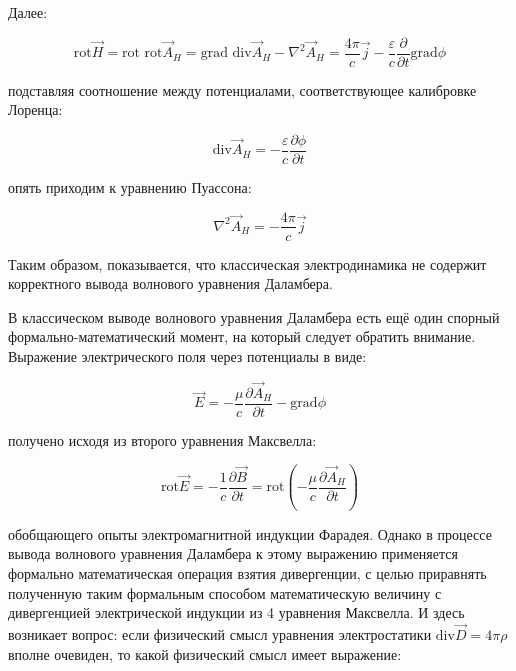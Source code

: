 \documentclass[12pt, a4paper]{article}
\begin{document}
Далее:

\begin{equation}
\text{rot} \vec{H} = \text{rot rot} \vec{A}_H = \text{grad div} \vec{A}_H - \nabla^2 \vec{A}_H = \frac{4\pi}{c} \vec{j} - \frac{\varepsilon}{c} \frac{\partial}{\partial t} \text{grad} \phi
\label{eq:rot_rot_A}
\end{equation}

подставляя соотношение между потенциалами, соответствующее калибровке Лоренца:

\begin{equation}
\text{div} \vec{A}_H = -\frac{\varepsilon}{c} \frac{\partial \phi}{\partial t}
\label{eq:lorentz_again}
\end{equation}

опять приходим к уравнению Пуассона:

\begin{equation}
\nabla^2 \vec{A}_H = -\frac{4\pi}{c} \vec{j}
\label{eq:poisson_again}
\end{equation}

Таким образом, показывается, что классическая электродинамика не содержит корректного вывода волнового уравнения Даламбера.

В классическом выводе волнового уравнения Даламбера есть ещё один спорный формально-математический момент, на который следует обратить внимание. Выражение электрического поля через потенциалы в виде:

\begin{equation}
\vec{E} = -\frac{\mu}{c} \frac{\partial \vec{A}_H}{\partial t} - \text{grad} \phi
\label{eq:E_final}
\end{equation}

получено исходя из второго уравнения Максвелла:

\begin{equation}
\text{rot} \vec{E} = -\frac{1}{c} \frac{\partial \vec{B}}{\partial t} = \text{rot} \left( -\frac{\mu}{c} \frac{\partial \vec{A}_H}{\partial t} \right)
\label{eq:faraday}
\end{equation}

обобщающего опыты электромагнитной индукции Фарадея. Однако в процессе вывода волнового уравнения Даламбера к этому выражению применяется формально математическая операция взятия дивергенции, с целью приравнять полученную таким формальным способом математическую величину с дивергенцией электрической индукции из 4 уравнения Максвелла. И здесь возникает вопрос: если физический смысл уравнения электростатики $\text{div} \vec{D} = 4\pi \rho$ вполне очевиден, то какой физический смысл имеет выражение:
\end{document}
